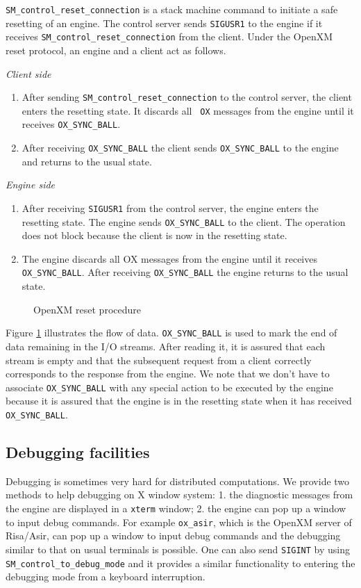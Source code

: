 {\tt SM\_control\_reset\_connection} is a stack machine command to
initiate a safe resetting of an engine.
The control server sends {\tt SIGUSR1} to the engine if it receives
{\tt SM\_control\_reset\_connection} from the client.
Under the OpenXM reset protocol, an engine and a client act as follows.

\vskip 2mm
\noindent
{\it Client side} 
\begin{enumerate}
\item After sending {\tt SM\_control\_reset\_connection} to the
control server, the client enters the resetting state. It discards all {\tt
OX} messages from the engine until it receives {\tt OX\_SYNC\_BALL}.
\item After receiving {\tt OX\_SYNC\_BALL} the client sends 
{\tt OX\_SYNC\_BALL} to the engine and returns to the usual state.
\end{enumerate}

\noindent
{\it Engine side}
\begin{enumerate}
\item 
After receiving {\tt SIGUSR1} from the control server,
the engine enters the resetting state.
The engine sends {\tt OX\_SYNC\_BALL} to the client.
The operation does not block because
the client is now in the resetting state.
\item The engine discards all OX messages from the engine until it
receives {\tt OX\_SYNC\_BALL}. After receiving {\tt OX\_SYNC\_BALL} 
the engine returns to the usual state.
\end{enumerate}

\begin{figure}[htbp]
\epsfxsize=8.5cm
\caption{OpenXM reset procedure}
\label{reset}
\end{figure}

Figure \ref{reset} illustrates the flow of data.
{\tt OX\_SYNC\_BALL} is used to mark the end of data remaining in the
I/O streams. After reading it, it is assured that each stream is empty
and that the subsequent request from a client correctly 
corresponds to the response from the engine.
We note that we don't have to associate {\tt OX\_SYNC\_BALL} with
any special action to be executed by the engine because it is
assured that the engine is in the resetting state when it has received
{\tt OX\_SYNC\_BALL}.

\subsection{Debugging facilities}
Debugging is sometimes very hard for distributed computations.
We provide two methods to help debugging on X window system:
1. the diagnostic messages from the engine are displayed in a {\tt xterm}
window;
2. the engine can pop up a window to input debug commands.
For example {\tt ox\_asir}, which is
the OpenXM server of Risa/Asir, can pop up a window to input
debug commands and the debugging similar to that on usual terminals is possible.
One can also send {\tt SIGINT} by using {\tt SM\_control\_to\_debug\_mode}
and it provides a similar functionality to entering the debugging
mode from a keyboard interruption.
